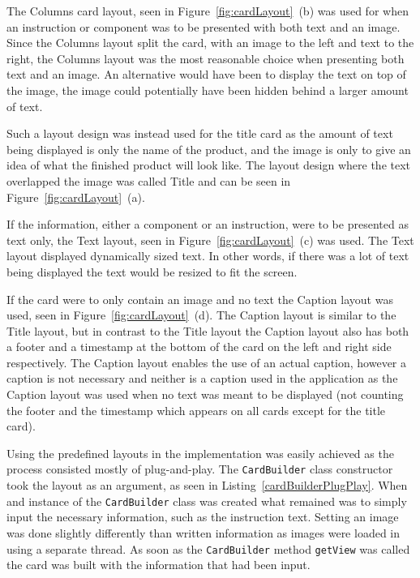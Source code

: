 The Columns card layout, seen in Figure~\ref{fig:cardLayout}~(b) was used for when an instruction or component was to be presented with both text and an image. Since the Columns layout split the card, with an image to the left and text to the right, the Columns layout was the most reasonable choice when presenting both text and an image. An alternative would have been to display the text on top of the image, the image could potentially have been hidden behind a larger amount of text. 

Such a layout design was instead used for the title card as the amount of text being displayed is only the name of the product, and the image is only to give an idea of what the finished product will look like. The layout design where the text overlapped the image was called Title and can be seen in Figure~\ref{fig:cardLayout}~(a).

If the information, either a component or an instruction, were to be presented as text only, the Text layout, seen in Figure~\ref{fig:cardLayout}~(c) was used. The Text layout displayed dynamically sized text. In other words, if there was a lot of text being displayed the text would be resized to fit the screen.

If the card were to only contain an image and no text the Caption layout was used, seen in Figure~\ref{fig:cardLayout}~(d). The Caption layout is similar to the Title layout, but in contrast to the Title layout the Caption layout also has both a footer and a timestamp at the bottom of the card on the left and right side respectively. The Caption layout enables the use of an actual caption, however a caption is not necessary and neither is a caption used in the application as the Caption layout was used when no text was meant to be displayed (not counting the footer and the timestamp which appears on all cards except for the title card).

Using the predefined layouts in the implementation was easily achieved as the process consisted mostly of plug-and-play. The \texttt{CardBuilder} class constructor took the layout as an argument, as seen in Listing~\ref{cardBuilderPlugPlay}. When and instance of the \texttt{CardBuilder} class was created what remained was to simply input the necessary information, such as the instruction text. Setting an image was done slightly differently than written information as images were loaded in using a separate thread. As soon as the \texttt{CardBuilder} method \texttt{getView} was called the card was built with the information that had been input.

